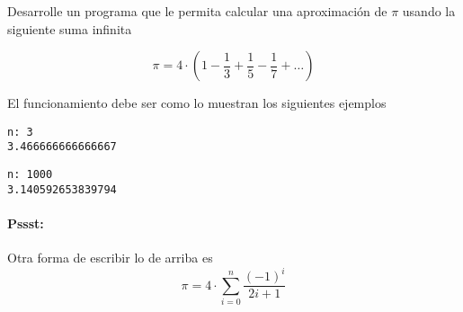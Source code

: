 Desarrolle un programa que le permita calcular una aproximación de $\pi$ usando la siguiente suma infinita

\begin{equation}
    \pi=4\cdot \left( 1-\frac{1}{3}+\frac{1}{5}-\frac{1}{7} + \ldots \right)
\end{equation}

El funcionamiento debe ser como lo muestran los siguientes ejemplos

\begin{lstlisting}[style=consola]
n: 3
3.466666666666667
\end{lstlisting}

\begin{lstlisting}[style=consola]
n: 1000
3.140592653839794
\end{lstlisting}

\paragraph{Pssst:} Otra forma de escribir lo de arriba es
$$ \pi = 4 \cdot \sum_{i=0}^n \frac{(-1)^i}{2i+1} $$